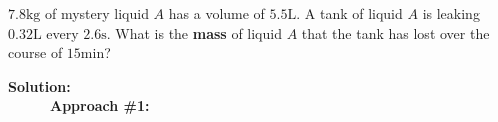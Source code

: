 \documentclass{article}
\begin{document}
\(7.8\text{kg}\) of mystery liquid \(A\) has a volume of \(5.5\text{L}\). A tank of liquid \(A\) is leaking \(0.32\text{L}\) every \(2.6\text{s}\). What is the {\bf mass} of liquid \(A\) that the tank has lost over the course of \(15\text{min}\)?

\vspace{5mm}

\textbf{Solution:} \\

~~~~~~\textbf{Approach \#1:} 
\end{document}

